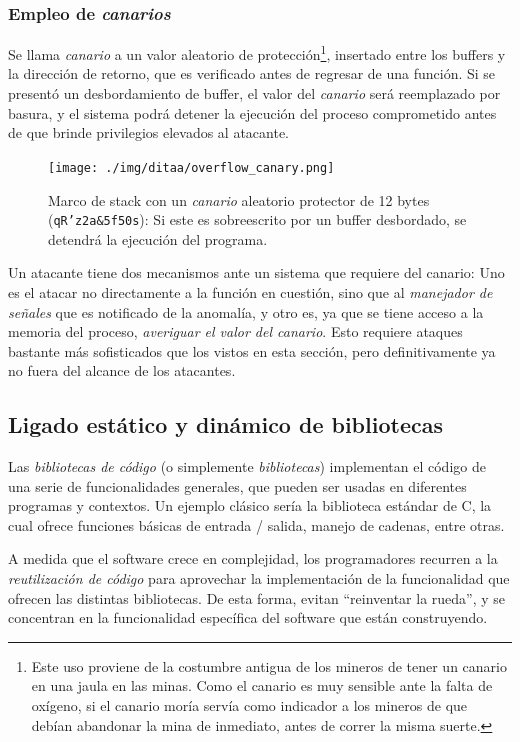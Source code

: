 \documentclass[11pt,fleqn]{book} %
\begin{document}
\subsubsection{Empleo de \emph{canarios}}
\label{sec-5-6-1-7}


Se llama \emph{canario} a un valor aleatorio de protección\footnote{Este uso
proviene de la costumbre antigua de los mineros de tener un canario en
una jaula en las minas. Como el canario es muy sensible ante la falta de
oxígeno, si el canario moría servía como indicador a los mineros de
que debían abandonar la mina de inmediato, antes de correr la misma
suerte. }, insertado entre los buffers y la dirección de retorno, que
es verificado antes de regresar de una función. Si se presentó un
desbordamiento de buffer, el valor del \emph{canario} será reemplazado por
basura, y el sistema podrá detener la ejecución del proceso
comprometido antes de que brinde privilegios elevados al atacante.

\begin{figure}[htb]
\centering
\texttt{[image: ./img/ditaa/overflow\_canary.png]}
\caption{\label{MEM_overflow_canary}Marco de stack con un \emph{canario} aleatorio protector de 12 bytes (\texttt{qR'z2a\&5f50s}): Si este es sobreescrito por un buffer desbordado, se detendrá la ejecución del programa.}
\end{figure}

Un atacante tiene dos mecanismos ante un sistema que requiere del
canario: Uno es el atacar no directamente a la función en cuestión,
sino que al \emph{manejador de señales} que es notificado de la anomalía,
y otro es, ya que se tiene acceso a la memoria del proceso,
\emph{averiguar el valor del canario}. Esto requiere ataques bastante más
sofisticados que los vistos en esta sección, pero definitivamente ya
no fuera del alcance de los atacantes.
\subsection{Ligado estático y dinámico de bibliotecas}
\label{sec-5-6-2}


Las \emph{bibliotecas de código} (o simplemente \emph{bibliotecas}) implementan el
código de una serie de funcionalidades generales, que
pueden ser usadas en diferentes programas y contextos. Un ejemplo clásico sería la
biblioteca estándar de C, la cual ofrece funciones básicas
de entrada / salida, manejo de cadenas, entre otras.

A medida que el software crece en complejidad, los programadores recurren
a la \emph{reutilización de código} para aprovechar la implementación de
la funcionalidad que ofrecen las distintas bibliotecas. 
De esta forma, evitan ``reinventar la rueda'', y se concentran en
la funcionalidad específica del software que están construyendo.
\end{document}

